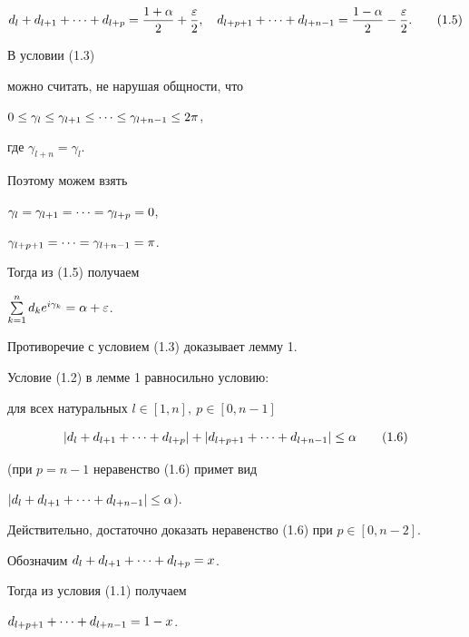 \begin{pf}
\begin{equation}


d_l+d_{l+1}+\cd+d_{l+p}=\frac{1+\al}{2}+\frac{\eps}{2},\quad


d_{l+p+1}+\cd+d_{l+n-1}=\frac{1-\al}{2}-\frac{\eps}{2}. \tag{1.5}


\end{equation}


В условии (1.3)


можно считать, не нарушая общности, что


$0\le\gamma_l\le\gamma_{l+1}\le\dotsb\le\gamma_{l+n-1}\le2\pi$,


где $\gamma_{l+n}=\gamma_l$.


Поэтому можем взять


$\gamma_l=\gamma_{l+1}=\dotsb=\gamma_{l+p}=0$,


$\gamma_{l+p+1}=\dotsb=\gamma_{l+n-1}=\pi$.


Тогда из (1.5) получаем


$\sum\limits_{k=1}^nd_ke^{i\gamma_k}=\alpha+\varepsilon$.


Противоречие с условием (1.3) доказывает лемму 1.


\end{pf}





\begin{note}


Условие (1.2) в лемме 1 равносильно условию: 


для всех натуральных $l\in[1,n], \ p\in[0,n-1]$


\begin{equation}


|d_l+d_{l+1}+\cd+d_{l+p}|+|d_{l+p+1}+\cd+d_{l+n-1}|\le\al \tag{1.6}


\end{equation}


(при $p=n-1$ неравенство (1.6) примет вид


$|d_l+d_{l+1}+\dotsb+d_{l+n-1}|\le\alpha$).


\end{note}





Действительно, достаточно доказать неравенство (1.6) при $p\in[0,n-2]$.


Обозначим $d_l+d_{l+1}+\dotsb+d_{l+p}=x$.


Тогда из условия (1.1) получаем


$d_{l+p+1}+\dotsb+d_{l+n-1}=1-x$.


